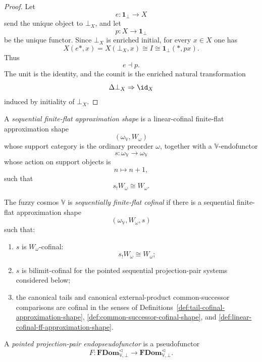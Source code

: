 \begin{proof}
Let
\[
    e:\mathbf 1_\bot\to X
\]
send the unique object to \(\bot_X\), and let
\[
    p:X\to\mathbf 1_\bot
\]
be the unique functor.  Since \(\bot_X\) is enriched initial, for every
\(x\in X\) one has
\[
    X(e*,x)=X(\bot_X,x)\cong I
    \cong
    \mathbf 1_\bot(*,px).
\]
Thus
\[
    e\dashv p.
\]
The unit is the identity, and the counit is the enriched natural transformation
\[
    \Delta\bot_X\Rightarrow\id_X
\]
induced by initiality of \(\bot_X\).
\end{proof}

\begin{definition}
\label{def:sequential-ff-approximation-shape}
A \emph{sequential finite-flat approximation shape} is a linear-cofinal
finite-flat approximation shape
\[
    (\omega_{\mathbb V},W_\omega)
\]
whose support category is the ordinary preorder \(\omega\), together with a
\(\mathbb V\)-endofunctor
\[
    s:\omega_{\mathbb V}\to\omega_{\mathbb V}
\]
whose action on support objects is
\[
    n\longmapsto n+1,
\]
such that
\[
    s_!W_\omega\cong W_\omega.
\]
\end{definition}

\begin{definition}
\label{def:sequential-ff-cofinality}
The fuzzy cosmos \(\mathbb V\) is \emph{sequentially finite-flat cofinal} if
there is a sequential finite-flat approximation shape
\[
    (\omega_{\mathbb V},W_\omega,s)
\]
such that:

\begin{enumerate}
    \item \(s\) is \(W_\omega\)-cofinal:
    \[
        s_!W_\omega\cong W_\omega;
    \]

    \item \(s\) is bilimit-cofinal for the pointed sequential projection-pair
    systems considered below;

    \item the canonical tails and canonical external-product common-successor
    comparisons are cofinal in the senses of
    Definitions~\ref{def:tail-cofinal-approximation-shape},
    \ref{def:common-successor-cofinal-shape}, and
    \ref{def:linear-cofinal-ff-approximation-shape}.
\end{enumerate}
\end{definition}

\begin{definition}
\label{def:pointed-projection-pair-endopseudofunctor}
A \emph{pointed projection-pair endopseudofunctor} is a pseudofunctor
\[
    F:
    \mathbf{FDom}^{\triangleleft}_{\mathbb V,\bot}
    \longrightarrow
    \mathbf{FDom}^{\triangleleft}_{\mathbb V,\bot}.
\]
\end{definition}

